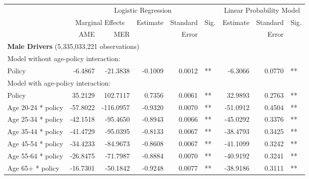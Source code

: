
\begin{table}%
\centering 
\begin{tabular}{l r r r r l r r l} 

\hline 
 
 & \multicolumn{5}{c}{Logistic Regression}  & \multicolumn{3}{c}{Linear Probability Model} \\ 

 \cmidrule(lr){2-6}\cmidrule(lr){7-9} 
 & \multicolumn{2}{c}{Marginal Effects} & Estimate & Standard & Sig. & Estimate & Standard & Sig. \\ 

 \cmidrule(lr){2-3} 
 &   AME &  MER  &          &  Error   &      &          &  Error   &     \\ 

\hline 
 
\multicolumn{8}{l}{\textbf{Male Drivers} (5,335,033,221 observations)} \\ 

\hline
\multicolumn{8}{l}{Model without age-policy interaction: } \\ 
Policy                   &  -6.4867        &  -21.3838       &  -0.1009        &  0.0012       &   **       &  -6.3066        &  0.0770       &   **       \\ 
\hline
\multicolumn{8}{l}{Model with age-policy interaction: } \\ 
Policy                   &  35.2129        &  102.7117       &  0.7356        &  0.0061       &   **       &  32.9893        &  0.2763       &   **       \\ 
Age 20-24 * policy   &  -57.8022        &  -116.0957       &  -0.9320        &  0.0070       &   **       &  -51.0912        &  0.4504       &   **       \\ 
Age 25-34 * policy   &  -42.1518        &  -95.4650       &  -0.8943        &  0.0066       &   **       &  -45.0292        &  0.3376       &   **       \\ 
Age 35-44 * policy   &  -41.4729        &  -95.0395       &  -0.8133        &  0.0067       &   **       &  -38.4793        &  0.3425       &   **       \\ 
Age 45-54 * policy   &  -34.4233        &  -84.9673       &  -0.8608        &  0.0067       &   **       &  -41.1099        &  0.3242       &   **       \\ 
Age 55-64 * policy   &  -26.8475        &  -71.7987       &  -0.8884        &  0.0070       &   **       &  -40.9192        &  0.3241       &   **       \\ 
Age 65+ * policy   &  -16.7301        &  -50.1842       &  -0.9248        &  0.0077       &   **       &  -38.9186        &  0.3111       &   **       \\ 


\end{tabular}
\end{table}
